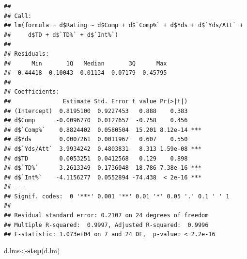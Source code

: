 \documentclass[]{article}
\newenvironment{Shaded}{\begin{snugshade}}{\end{snugshade}}
\newcommand{\KeywordTok}[1]{\textcolor[rgb]{0.13,0.29,0.53}{\textbf{#1}}}
\newcommand{\NormalTok}[1]{#1}
\begin{document}
\begin{verbatim}
## 
## Call:
## lm(formula = d$Rating ~ d$Comp + d$`Comp%` + d$Yds + d$`Yds/Att` + 
##     d$TD + d$`TD%` + d$`Int%`)
## 
## Residuals:
##      Min       1Q   Median       3Q      Max 
## -0.44418 -0.10043 -0.01134  0.07179  0.45795 
## 
## Coefficients:
##               Estimate Std. Error t value Pr(>|t|)    
## (Intercept)  0.8195100  0.9227453   0.888    0.383    
## d$Comp      -0.0096770  0.0127657  -0.758    0.456    
## d$`Comp%`    0.8824402  0.0580504  15.201 8.12e-14 ***
## d$Yds        0.0007261  0.0011967   0.607    0.550    
## d$`Yds/Att`  3.9934242  0.4803831   8.313 1.59e-08 ***
## d$TD         0.0053251  0.0412568   0.129    0.898    
## d$`TD%`      3.2613349  0.1736048  18.786 7.38e-16 ***
## d$`Int%`    -4.1156277  0.0552894 -74.438  < 2e-16 ***
## ---
## Signif. codes:  0 '***' 0.001 '**' 0.01 '*' 0.05 '.' 0.1 ' ' 1
## 
## Residual standard error: 0.2107 on 24 degrees of freedom
## Multiple R-squared:  0.9997, Adjusted R-squared:  0.9996 
## F-statistic: 1.073e+04 on 7 and 24 DF,  p-value: < 2.2e-16
\end{verbatim}

\begin{Shaded}
\begin{Highlighting}[]
\NormalTok{d.lms<-}\KeywordTok{step}\NormalTok{(d.lm)}
\end{Highlighting}
\end{Shaded}
\end{document}
